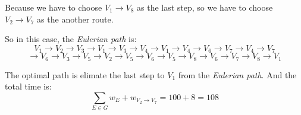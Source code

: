 \documentclass{article}
\begin{document}
{{        Because we have to choose \(\mathit{V}_{\mathrm{1}} \to \mathit{V}_{\mathrm{8}}\) as the last step, so we have to choose \(\mathit{V}_{\mathrm{2}} \to \mathit{V}_{\mathrm{7}}\) as the another route.

        So in this case, the \textit{Eulerian path} is:
        \[\mathit{V}_{\mathrm{1}} \to \mathit{V}_{\mathrm{2}} \to \mathit{V}_{\mathrm{3}} \to \mathit{V}_{\mathrm{1}} \to \mathit{V}_{\mathrm{3}} \to \mathit{V}_{\mathrm{4}} \to \mathit{V}_{\mathrm{1}} \to \mathit{V}_{\mathrm{4}} \to \mathit{V}_{\mathrm{6}} \to \mathit{V}_{\mathrm{7}} \to \mathit{V}_{\mathrm{4}} \to \mathit{V}_{\mathrm{7}}\]
        \[\to \mathit{V}_{\mathrm{6}} \to \mathit{V}_{\mathrm{3}} \to \mathit{V}_{\mathrm{5}} \to \mathit{V}_{\mathrm{2}} \to \mathit{V}_{\mathrm{5}} \to \mathit{V}_{\mathrm{6}} \to \mathit{V}_{\mathrm{5}} \to \mathit{V}_{\mathrm{8}} \to \mathit{V}_{\mathrm{6}} \to \mathit{V}_{\mathrm{7}} \to \mathit{V}_{\mathrm{8}} \to \mathit{V}_{\mathrm{1}}\]

        The optimal path is elimate the last step to \(\mathit{V}_{\mathrm{1}}\) from the \textit{Eulerian path}. And the total time is:
        \[\sum_{\mathit{E}\in\mathit{G}}\mathit{w_E} + \mathit{w}_{\mathit{V}_{\mathrm{2}} \to \mathit{V}_{\mathrm{7}}} = \mathrm{100 + 8 = 108}\]
    }

}
\end{document}
